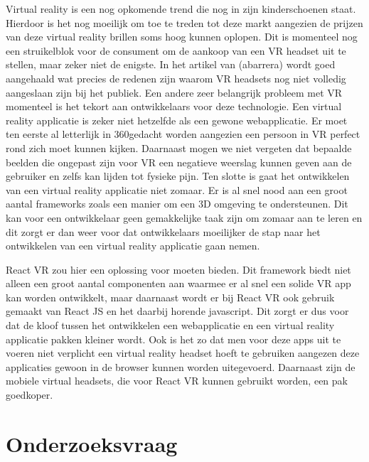 Virtual reality is een nog opkomende trend die nog in zijn kinderschoenen staat. Hierdoor is het nog moeilijk om toe te treden tot deze markt aangezien de prijzen van deze virtual reality brillen soms hoog kunnen oplopen. Dit is momenteel nog een struikelblok voor de consument om de aankoop van een VR  headset uit te stellen, maar zeker niet de enigste. In het artikel van (abarrera) wordt goed aangehaald wat precies de redenen zijn waarom VR headsets nog niet volledig aangeslaan zijn bij het publiek. Een andere zeer belangrijk probleem met VR momenteel is het tekort aan ontwikkelaars voor deze technologie. Een virtual reality applicatie is zeker niet hetzelfde als een gewone webapplicatie. Er moet ten eerste al letterlijk in 360\textdegree gedacht worden aangezien een persoon in VR perfect rond zich moet kunnen kijken. Daarnaast mogen we niet vergeten dat bepaalde beelden die ongepast zijn voor VR een negatieve weerslag kunnen geven aan de gebruiker en zelfs kan lijden tot fysieke pijn. Ten slotte is gaat het ontwikkelen van een virtual reality applicatie niet zomaar. Er is al snel nood aan een groot aantal frameworks zoals een manier om een 3D omgeving te ondersteunen. Dit kan voor een ontwikkelaar geen gemakkelijke taak zijn om zomaar aan te leren en dit zorgt er dan weer voor dat ontwikkelaars moeilijker de stap naar het ontwikkelen van een virtual reality applicatie gaan nemen.

 React VR zou hier een oplossing voor moeten bieden. Dit framework biedt niet alleen een groot aantal componenten aan waarmee er al snel een solide VR app kan worden ontwikkelt, maar daarnaast wordt er bij React VR ook gebruik gemaakt van React JS en het daarbij horende javascript. Dit zorgt er dus voor dat de kloof tussen het ontwikkelen een webapplicatie en een virtual reality applicatie pakken kleiner wordt. Ook is het zo dat men voor deze apps uit te voeren niet verplicht een virtual reality headset hoeft te gebruiken aangezen deze applicaties gewoon in de browser kunnen worden uitegevoerd. Daarnaast zijn de mobiele virtual headsets, die voor React VR kunnen gebruikt worden, een pak goedkoper.


\section{Onderzoeksvraag}
\label{sec:onderzoeksvraag}

